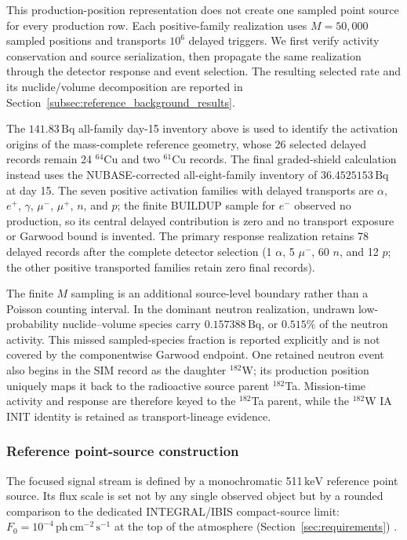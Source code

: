 \documentclass[11pt]{article}
\newcommand{\keV}{\ensuremath{\,\mathrm{keV}}}
\newcommand{\phcms}{\ensuremath{\,\mathrm{ph\,cm^{-2}\,s^{-1}}}}
\newcommand{\fzero}{F_{0}}
\begin{document}
This production-position representation does not create one sampled point source
for every production row. Each positive-family realization uses $M=50{,}000$
sampled positions and transports $10^6$ delayed triggers. We first verify activity
conservation and source serialization, then propagate the same realization
through the detector response and event selection. The resulting selected rate
and its nuclide/volume decomposition are reported in
Section~\ref{subsec:reference_background_results}.

The $141.83\,\mathrm{Bq}$ all-family day-15 inventory above is used to identify
the activation origins of the mass-complete reference geometry, whose 26 selected
delayed records remain 24 $^{64}$Cu and two $^{61}$Cu records. The final
graded-shield calculation instead uses the NUBASE-corrected all-eight-family
inventory of $36.4525153\,\mathrm{Bq}$ at day 15. The seven positive activation
families with delayed transports are $\alpha$, $e^+$, $\gamma$, $\mu^-$, $\mu^+$,
$n$, and $p$; the finite BUILDUP sample for $e^-$ observed no production, so its
central delayed contribution is zero and no transport exposure or Garwood bound
is invented. The primary response realization retains 78 delayed records after
the complete detector selection (1 $\alpha$, 5 $\mu^-$, 60 $n$, and 12 $p$;
the other positive transported families retain zero final records).

The finite $M$ sampling is an additional source-level boundary rather than a
Poisson counting interval. In the dominant neutron realization, undrawn
low-probability nuclide--volume species carry $0.157388\,\mathrm{Bq}$, or
$0.515\%$ of the neutron activity. This missed sampled-species fraction is
reported explicitly and is not covered by the componentwise Garwood endpoint.
One retained neutron event also begins in the SIM record as the daughter
$^{182}$W; its production position uniquely maps it back to the radioactive
source parent $^{182}$Ta. Mission-time activity and response are therefore keyed
to the $^{182}$Ta parent, while the $^{182}$W IA INIT identity is retained as
transport-lineage evidence.

\subsubsection{Reference point-source construction}
\label{subsec:pointsource}

The focused signal stream is defined by a monochromatic 511\keV{} reference
point source. Its flux scale is set not by any single observed object but by a
rounded comparison to the dedicated INTEGRAL/IBIS compact-source limit:
$\fzero=10^{-4}\phcms$ at the top of the atmosphere
(Section~\ref{sec:requirements}) \cite{DeCesare2011}.
\end{document}
